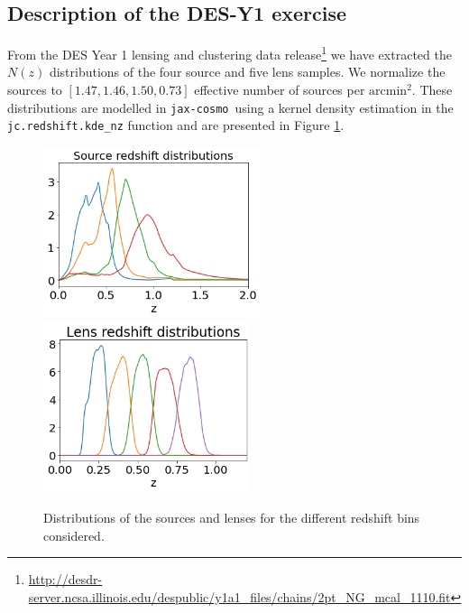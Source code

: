 \documentclass[twocolumn,twocolappendix,nofootinbib,iop]{openjournal}
\newcommand{\jaxcosmo}{\texttt{jax-cosmo}}
\begin{document}
\subsection{Description of the DES-Y1 exercise}
\label{sec-DESY1}
From the DES Year 1 lensing and clustering data release\footnote{\url{http://desdr-server.ncsa.illinois.edu/despublic/y1a1_files/chains/2pt_NG_mcal_1110.fit}} we have extracted the $N(z)$ distributions of the four source and five lens samples. We normalize the sources to $[1.47, 1.46, 1.50, 0.73]$ effective number of sources per $\mathrm{arcmin}^2$. These distributions are modelled in \jaxcosmo\ using a kernel density estimation in the \texttt{jc.redshift.kde\_nz} function and are presented in Figure \ref{fig-DESY1-src-lens-redshift}.
\begin{figure}
\centering
\includegraphics[height=5cm]{figures/DESY1-source-redshift.png}\\
\includegraphics[height=5cm]{figures/DESY1-lens-redshift.png}
\caption{Distributions of the sources and lenses for the different redshift bins considered.}
\label{fig-DESY1-src-lens-redshift}
\end{figure}
\end{document}
